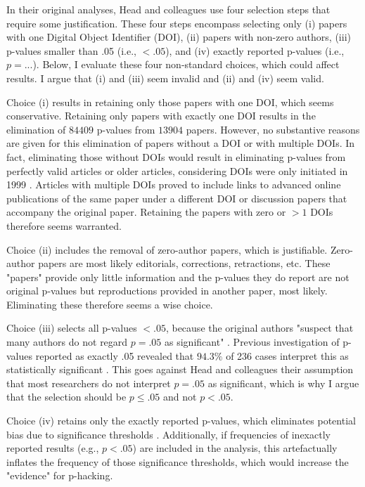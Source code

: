 In their original analyses, Head and colleagues use four selection steps that require some justification. These four steps encompass selecting only (i) papers with one Digital Object Identifier (DOI), (ii) papers with non-zero authors, (iii) p-values smaller than .05 (i.e., $<.05$), and (iv) exactly reported p-values (i.e., $p=...$). Below, I evaluate these four non-standard choices, which could affect results. I argue that (i) and (iii) seem invalid and (ii) and (iv) seem valid.

Choice (i) results in retaining only those papers with one DOI, which seems conservative. Retaining only papers with exactly one DOI results in the elimination of $84409$ p-values from $13904$ papers. However, no substantive reasons are given for this elimination of papers without a DOI or with multiple DOIs. In fact, eliminating those without DOIs would result in eliminating p-values from perfectly valid articles or older articles, considering DOIs were only initiated in 1999 \cite{Crossre2009}. Articles with multiple DOIs proved to include links to advanced online publications of the same paper under a different DOI or discussion papers that accompany the original paper. Retaining the papers with zero or $>1$ DOIs therefore seems warranted.

Choice (ii) includes the removal of zero-author papers, which is justifiable. Zero-author papers are most likely editorials, corrections, retractions, etc. These "papers" provide only little information and the p-values they do report are not original p-values but reproductions provided in another paper, most likely. Eliminating these therefore seems a wise choice.

Choice (iii) selects all p-values $<.05$, because the original authors "suspect that many authors do not regard $p=.05$ as significant" \cite{Head2015}. Previous investigation of p-values reported as exactly .05 revealed that $94.3\%$ of 236 cases interpret this as statistically significant \cite{Nuijten2015}. This goes against Head and colleagues their assumption that most researchers do not interpret $p=.05$ as significant, which is why I argue that the selection should be $p\leq.05$ and not $p<.05$.

Choice (iv) retains only the exactly reported p-values, which eliminates potential bias due to significance thresholds \cite{Ridley2007}. Additionally, if frequencies of inexactly reported results (e.g., $p<.05$) are included in the analysis, this artefactually inflates the frequency of those significance thresholds, which would increase the "evidence" for p-hacking. 